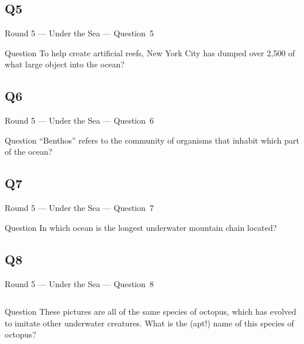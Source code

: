 \documentclass[11pt]{beamer}
\begin{document}
\subsection*{Q5}
\begin{frame}[t]{Round 5 --- Under the Sea --- \mbox{Question 5}}
\vspace{-0.5em}
\begin{block}{Question}
To help create artificial reefs, New York City has dumped over 2,500 of what large object into the ocean?
\end{block}
\end{frame}
\subsection*{Q6}
\begin{frame}[t]{Round 5 --- Under the Sea --- \mbox{Question 6}}
\vspace{-0.5em}
\begin{block}{Question}
``Benthos'' refers to the community of organisms that inhabit which part of the ocean?
\end{block}
\end{frame}
\subsection*{Q7}
\begin{frame}[t]{Round 5 --- Under the Sea --- \mbox{Question 7}}
\vspace{-0.5em}
\begin{block}{Question}
In which ocean is the longest underwater mountain chain located?
\end{block}
\end{frame}
\subsection*{Q8}
\begin{frame}[t]{Round 5 --- Under the Sea --- \mbox{Question 8}}
\vspace{-0.5em}
\begin{columns}[T,totalwidth=\linewidth]
\begin{column}{0.32\linewidth}
\begin{block}{Question}
These pictures are all of the same species of octopus, which has evolved to imitate other underwater creatures. What is the (apt!) name of this species of octopus?
\end{block}
\end{column}
\begin{column}{0.65\linewidth}
\begin{center}
\texttt{[image: \{Images/mimic]}.jpg}
\end{center}
\end{column}
\end{columns}
\end{frame}
\end{document}
